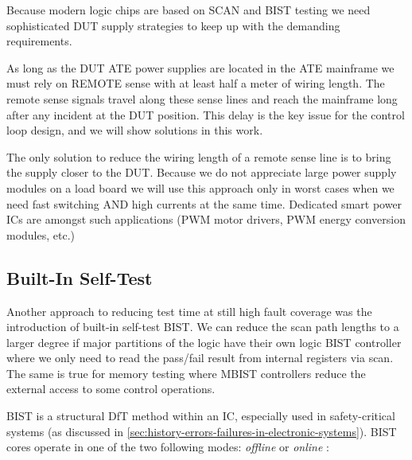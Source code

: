 Because modern logic chips are based on SCAN and \ac{BIST} testing we need
sophisticated DUT supply strategies to keep up with the demanding requirements.

As long as the DUT ATE power supplies are located in the ATE mainframe we must
rely on REMOTE sense with at least half a meter of wiring length.
The remote sense signals travel along these sense lines and reach the
mainframe long after any incident at the DUT position.
This delay is the key issue for the control loop design, and we will show
solutions in this work.

The only solution to reduce the wiring length of a remote sense line is to
bring the supply closer to the DUT.
Because we do not appreciate large power supply modules on a load board we will
use this approach only in worst cases when we need fast switching AND high
currents at the same time.
Dedicated smart power ICs are amongst such applications (PWM motor drivers,
PWM energy conversion modules, etc.)


\subsection{Built-In Self-Test}
\label{subsec:bist}

Another approach to reducing test time at still high fault coverage was the
introduction of built-in self-test \ac{BIST}.
We can reduce the scan path lengths to a larger degree if major partitions of
the logic have their own logic \ac{BIST} controller where we only need to read
the pass/fail result from internal registers via scan.
The same is true for memory testing where \ac{MBIST} controllers reduce the
external access to some control operations.

\ac{BIST} is a structural \ac{DfT} method within an \ac{IC}, especially used in
safety-critical systems (as discussed in
\autoref{sec:history-errors-failures-in-electronic-systems}).
\ac{BIST} cores operate in one of the two following
modes: \emph{offline} or \emph{online} \autocite{953276}:

